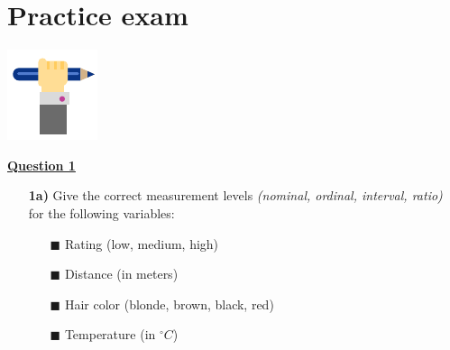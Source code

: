 
\begin{minipage}{0.8\textwidth}
\section{Practice exam}
\end{minipage}%
\hfill%
\begin{minipage}{0.1\textwidth}
\includegraphics[width=\linewidth]{Files/Images/pencilhand.pdf}
\end{minipage}
\vspace*{.1cm}

\underline{\textbf{Question 1}} \\

\begin{itemize}

\item[\textbf{1a)}] Give the correct measurement levels \textit{(nominal, ordinal, interval, ratio)} for the following variables: 
\begin{itemize}
\item[$\blacksquare$] Rating (low, medium, high)
\item[$\blacksquare$] Distance (in meters)
\item[$\blacksquare$] Hair color (blonde, brown, black, red)
\item[$\blacksquare$] Temperature (in $^{\circ} C$) 
\end{itemize}
\end{itemize}

